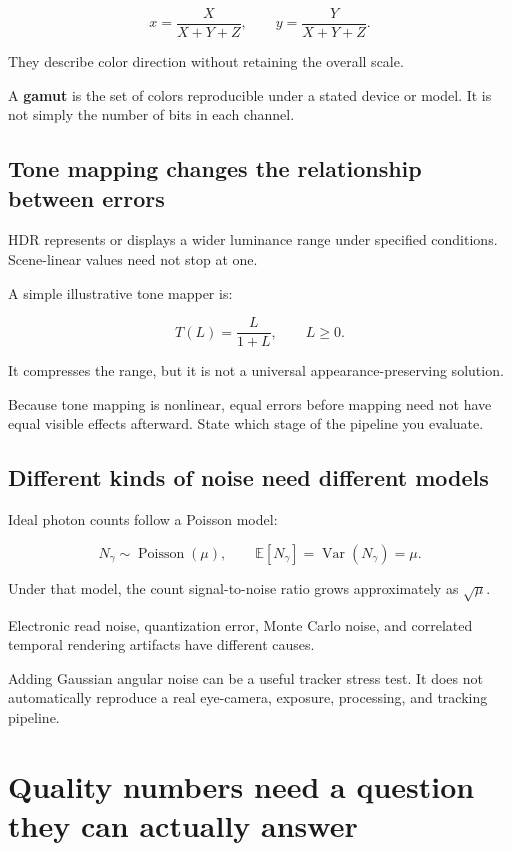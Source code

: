 \[
x=\frac{X}{X+Y+Z},
\qquad y=\frac{Y}{X+Y+Z}.
\]

They describe color direction without retaining the overall scale.

A \textbf{gamut} is the set of colors reproducible under a stated device or model. It is not simply the number of bits in each channel.

\subsection{Tone mapping changes the relationship between errors}\label{04-visual-computing-ii-ch043-tone-mapping-changes-the-relationship-between-errors}

HDR represents or displays a wider luminance range under specified conditions. Scene-linear values need not stop at one.

A simple illustrative tone mapper is:

\[
T(L)=\frac{L}{1+L},
\qquad L\geq0.
\]

It compresses the range, but it is not a universal appearance-preserving solution.

Because tone mapping is nonlinear, equal errors before mapping need not have equal visible effects afterward. State which stage of the pipeline you evaluate.

\subsection{Different kinds of noise need different models}\label{04-visual-computing-ii-ch043-different-kinds-of-noise-need-different-models}

Ideal photon counts follow a Poisson model:

\[
N_\gamma\sim\operatorname{Poisson}(\mu),
\qquad
\mathbb E[N_\gamma]=\operatorname{Var}(N_\gamma)=\mu.
\]

Under that model, the count signal-to-noise ratio grows approximately as \(\sqrt{\mu}\).

Electronic read noise, quantization error, Monte Carlo noise, and correlated temporal rendering artifacts have different causes.

Adding Gaussian angular noise can be a useful tracker stress test. It does not automatically reproduce a real eye-camera, exposure, processing, and tracking pipeline.

\section{Quality numbers need a question they can actually answer}\label{04-visual-computing-ii-ch043-quality-numbers-need-a-question-they-can-actually-answer}

